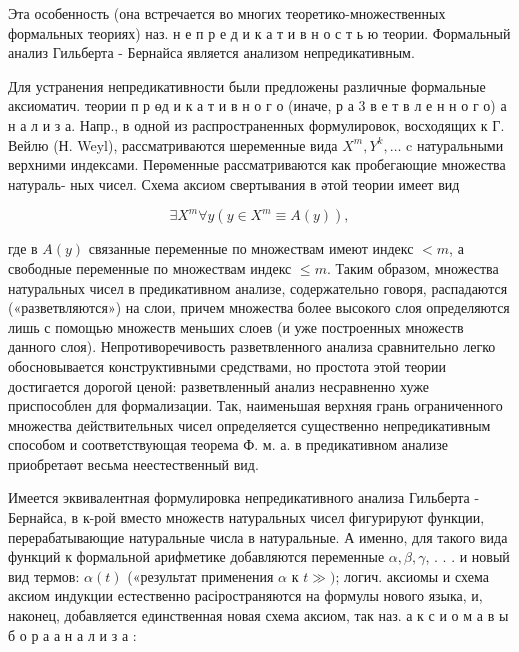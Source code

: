 \documentclass[10pt]{article}
\begin{document}
Эта особенность (она встречается во многих теоретико-множественных формальных теориях) наз. н е п р е д и к а т и в н о с т ь ю теории. Формальный анализ Гильберта - Бернайса является анализом непредикативным.



Для устранения непредикативности были предложены различные формальные аксиоматич. теории п р өд и к а т и в н о г о (иначе, р а 3 в е т в л е н н о г о) а н а л и з а. Напр., в одной из распространенных формулировок, восходящих к Г. Вейлю (Н. Weyl), рассматриваются шеременные вида $X^{m}, Y^{k}, \ldots$ c натуральными верхними индексами. Перөменные рассматриваются как пробегающие множества натураль- ных чисел. Схема аксиом свертывания в әтой теории имеет вид



\[

\exists X^{m} \forall y\left(y \in X^{m} \equiv A(y)\right),

\]



где в $A(y)$ связанные переменные по множествам имеют индекс $<m$, а свободные переменные по множествам индекс $\leqslant m$. Таким образом, множества натуральных чисел в предикативном анализе, содержательно говоря, распадаются («разветвляются») на слои, причем множества более высокого слоя определяются лишь с помощью множеств меньших слоев (и уже построенных множеств данного слоя). Непротиворечивость разветвленного анализа сравнительно легко обосновывается конструктивными средствами, но простота этой теории достигается дорогой ценой: разветвленный анализ несравненно хуже приспособлен для формализации. Так, наименьшая верхняя грань ограниченного множества действительных чисел определяется существенно непредикативным способом и соответствующая теорема Ф. м. а. в предикативном анализе приобретаөт весьма неестественный вид.



Имеется эквивалентная формулировка непредикативного анализа Гильберта - Бернайса, в к-рой вместо множеств натуральных чисел фигурируют функции, перерабатывающие натуральные числа в натуральные. А именно, для такого вида функций к формальной арифметике добавляются переменные $\alpha, \beta, \gamma$, . . . и новый вид термов: $\alpha(t)$ («результат применения $\alpha$ к $t \gg)$; логич. аксиомы и схема аксиом индукции естественно расіространяются на формулы нового языка, и, наконец, добавляется единственная новая схема аксиом, так наз. а к с и о м а в ы б о р а а н а л и з а :
\end{document}
